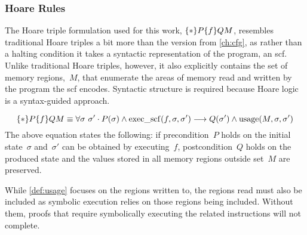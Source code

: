 \subsubsection{Hoare Rules}\label{scf_hoare}
The Hoare triple formulation used for this work, $\{*\}P\{f\}{Q}M$,
resembles traditional Hoare triples a bit more than the version from \cref{ch:cfg},%
as rather than a halting condition
it takes a syntactic representation of the program, an \ac{scf}.
Unlike traditional Hoare triples, however,
it also explicitly contains the set of memory regions,~$M$,
that enumerate the areas of memory read and written by the program
the \ac{scf} encodes.
Syntactic structure is required because Hoare logic is a syntax-guided approach.
\begin{definition}\label{def:usage}
  \begin{equation}
    \{*\}P\{f\}{Q}{M}\equiv
    \forall\sigma~\sigma'\cdot P(\sigma)\wedge\operatorname{exec\_scf}(f,\sigma,\sigma')\longrightarrow
    Q(\sigma')\wedge\operatorname{usage}(M,\sigma,\sigma')
  \end{equation}
  The above equation states the following:
  if precondition~$P$ holds on the initial state~$\sigma$
  and~$\sigma'$ can be obtained by executing~$f$,
  postcondition~$Q$ holds on the produced state
  and the values stored in all memory regions outside set~$M$ are preserved.
\end{definition}
While \cref{def:usage} focuses on the regions written to,
the regions read must also be included as symbolic execution
relies on those regions being included.
Without them, proofs that require symbolically executing
the related instructions will not complete.
